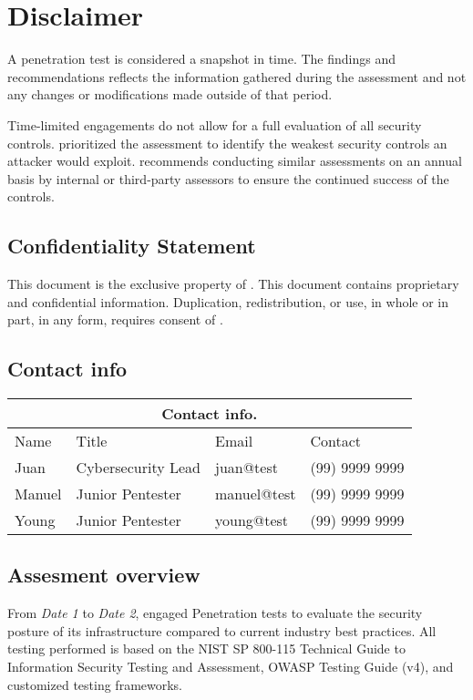 \section{Disclaimer}

A penetration test is considered a snapshot in time. The findings and recommendations reflects the
information gathered during the assessment and not any changes or modifications made outside of that
period. 

Time-limited engagements do not allow for a full evaluation of all security controls.
\textbf{\companyName} prioritized the assessment to identify the weakest security controls an
attacker would exploit. \textbf{\companyName} recommends conducting similar assessments on an annual
basis by internal or third-party assessors to ensure the continued success of the controls. 

\subsection{Confidentiality Statement}

This document is the exclusive property of \textbf{\companyName}. This
document contains proprietary and confidential information. Duplication, redistribution, or use, in
whole or in part, in any form, requires consent of \textbf{\companyName}. 

\subsection{Contact info}

\begin{tabular}{ |p{3cm}|p{3cm}|p{3cm}|p{3cm}|  }
\hline
\multicolumn{4}{|c|}{\textbf{Contact info.}} \\
\hline
	Name & Title & Email & Contact \\
\hline
    Juan & Cybersecurity Lead & juan@test & (99) 9999 9999 \\
    Manuel & Junior Pentester & manuel@test & (99) 9999 9999 \\
    Young & Junior Pentester & young@test & (99) 9999 9999 \\
\hline
\end{tabular}

\subsection{Assesment overview}
From \textit{Date 1} to \textit{Date 2}, \textbf{\companyName} engaged Penetration tests to evaluate
the security posture of its infrastructure compared to current industry best practices. All testing
performed is based on the NIST SP 800-115 Technical Guide to Information Security Testing and
Assessment, OWASP Testing Guide (v4), and customized testing frameworks.  

